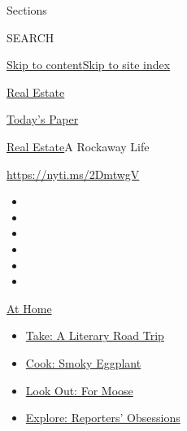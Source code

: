 Sections

SEARCH

\protect\hyperlink{site-content}{Skip to
content}\protect\hyperlink{site-index}{Skip to site index}

\href{https://www.nytimes3xbfgragh.onion/section/realestate}{Real
Estate}

\href{https://myaccount.nytimes3xbfgragh.onion/auth/login?response_type=cookie\&client_id=vi}{}

\href{https://www.nytimes3xbfgragh.onion/section/todayspaper}{Today's
Paper}

\href{/section/realestate}{Real Estate}\textbar{}A Rockaway Life

\url{https://nyti.ms/2DmtwgV}

\begin{itemize}
\item
\item
\item
\item
\item
\item
\end{itemize}

\href{https://www.nytimes3xbfgragh.onion/spotlight/at-home?action=click\&pgtype=Article\&state=default\&region=TOP_BANNER\&context=at_home_menu}{At
Home}

\begin{itemize}
\tightlist
\item
  \href{https://www.nytimes3xbfgragh.onion/2020/07/28/books/time-for-a-literary-road-trip.html?action=click\&pgtype=Article\&state=default\&region=TOP_BANNER\&context=at_home_menu}{Take:
  A Literary Road Trip}
\item
  \href{https://www.nytimes3xbfgragh.onion/2020/07/29/magazine/bored-with-your-home-cooking-some-smoky-eggplant-will-fix-that.html?action=click\&pgtype=Article\&state=default\&region=TOP_BANNER\&context=at_home_menu}{Cook:
  Smoky Eggplant}
\item
  \href{https://www.nytimes3xbfgragh.onion/2020/07/27/travel/moose-michigan-isle-royale.html?action=click\&pgtype=Article\&state=default\&region=TOP_BANNER\&context=at_home_menu}{Look
  Out: For Moose}
\item
  \href{https://www.nytimes3xbfgragh.onion/interactive/2020/at-home/even-more-reporters-editors-diaries-lists-recommendations.html?action=click\&pgtype=Article\&state=default\&region=TOP_BANNER\&context=at_home_menu}{Explore:
  Reporters' Obsessions}
\end{itemize}

